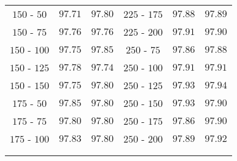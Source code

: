 \begin{center}
\begin{table}[]
\begin{center}
\begin{tabular}{cc|c||cc|c}
$150$ - $50$  & $97.71$ & $97.80$ &  $225$ - $175$ & $97.88$ & $97.89$ \\ [1pt]
$150$ - $75$  & $97.76$ & $97.76$ &  $225$ - $200$ & $97.91$ & $97.90$ \\ [1pt]
$150$ - $100$ & $97.75$ & $97.85$ &  $250$ - $75$  & $97.86$ & $97.88$ \\ [1pt]
$150$ - $125$ & $97.78$ & $97.74$ &  $250$ - $100$ & $97.91$ & $97.91$ \\ [1pt]
$150$ - $150$ & $97.75$ & $97.80$ &  $250$ - $125$ & $97.93$ & $97.94$ \\ [1pt]
$175$ - $50$  & $97.85$ & $97.80$ &  $250$ - $150$ & $97.93$ & $97.90$ \\ [1pt]
$175$ - $75$  & $97.80$ & $97.80$ &  $250$ - $175$ & $97.86$ & $97.90$ \\ [1pt]
$175$ - $100$ & $97.83$ & $97.80$ &  $250$ - $200$ & $97.89$ & $97.92$ \\ [1pt]

\hline\\[-11pt]
\hline\\[-8pt]
\end{tabular}\\[5pt]
\end{center}
\normalsize
\end{table}
\end{center}